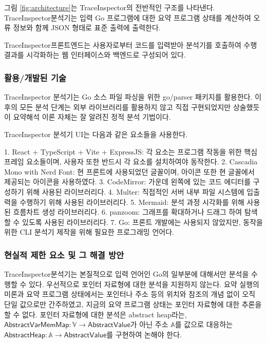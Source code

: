 \documentclass[a4paper,12pt]{article}
\newcommand{\traceinspector}{\textsf{TraceInspector}}
\begin{document}
그림 \ref{fig:architecture}는 \traceinspector 의 전반적인 구조를 나타낸다. \traceinspector 분석기는 입력 Go 프로그램에 대한 요약 프로그램 상태를 계산하여 오류 정보와 함께 JSON 형태로 표준 출력에 출력한다.

\traceinspector 프론트엔드는 사용자로부터 코드를 입력받아 분석기를 호출하여 수행 결과를 시각화하는 웹 인터페이스와 백엔드로 구성되어 있다.

\subsubsection{활용/개발된 기술}

\textsf{TraceInspector} 분석기는 Go 소스 파일 파싱을 위한 \textsf{go/parser}\cite{goparser} 패키지를 활용한다.
이후의 모든 분석 단계는 외부 라이브러리를 활용하지 않고 직접 구현되었지만 상술했듯이 요약해석 이론 자체는 잘 알려진 정적 분석 기법이다.

\textsf{TraceInspector} 분석기 UI는 다음과 같은 요소들을 사용한다.

1. React + TypeScript + Vite + ExpressJS: 각 요소는 프로그램 작동을 위한 핵심 프레임 요소들이며, 사용자 또한 반드시 각 요소를 설치하여야 동작한다.
2. Cascadia Mono with Nerd Font: 현 프론트에 사용되었던 글꼴이며, 아이콘 또한 현 글꼴에서 제공되는 아이콘을 사용하였다.
3. CodeMirror: 가운데 왼쪽에 있는 코드 에디터를 구성하기 위해 사용된 라이브러리다.
4. Multer: 직접적인 서버 내부 파일 시스템에 입출력을 수행하기 위해 사용된 라이브러리다.
5. Mermaid: 분석 과정 시각화를 위해 사용된 흐름차트 생성 라이브러리다.
6. panzoom: 그래프를 확대하거나 드래그 하여 탐색할 수 있도록 사용된 라이브러리다.
7. Go: 프론트 개발에는 사용되지 않았지만, 동작을 위한 CLI 분석기 제작을 위해 필요한 프로그래밍 언어다.

\subsubsection{현실적 제한 요소 및 그 해결 방안}

\traceinspector 분석기는 본질적으로 입력 언어인 Go의 일부분에 대해서만 분석을 수행할 수 있다. 우선적으로 포인터 자료형에 대한 분석을 지원하지 않는다. 
요약 실행의미론과 요약 프로그램 상태에서는 포인터나 주소 등의 위치와 참조의 개념 없이 오직 단일 값으로만 간주하였고, 지금의 요약 프로그램 상태는 포인터 자료형에 대한 추론을 할 수 없다.
포인터 자료형에 대한 분석은 abstract heap라는, $\mathsf{AbstractVarMemMap} : \mathbb{V} \rightarrow \mathsf{AbstractValue}$가 아닌 
주소 $\mathbb{A}$를 값으로 대응하는 $\mathsf{AbstractHeap} : \mathbb{A} \rightarrow \mathsf{AbstractValue}$를 구현하여 논해야 한다.
\end{document}
